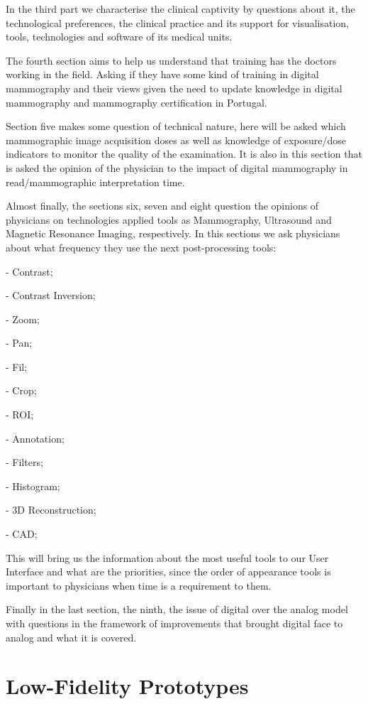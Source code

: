 In the third part we characterise the clinical captivity by questions about it, the technological preferences, the clinical practice and its support for visualisation, tools, technologies and software of its medical units.

The fourth section aims to help us understand that training has the doctors working in the field. Asking if they have some kind of training in digital mammography and their views given the need to update knowledge in digital mammography and mammography certification in Portugal.

Section five makes some question of technical nature, here will be asked which mammographic image acquisition doses as well as knowledge of exposure/dose indicators to monitor the quality of the examination. It is also in this section that is asked the opinion of the physician to the impact of digital mammography in read/mammographic interpretation time.

\clearpage

Almost finally, the sections six, seven and eight question the opinions of physicians on technologies applied tools as Mammography, Ultrasound and Magnetic Resonance Imaging, respectively. In this sections we ask physicians about what frequency they use the next post-processing tools:

- Contrast;

- Contrast Inversion;

- Zoom;

- Pan;

- Fil;

- Crop;

- ROI;

- Annotation;

- Filters;

- Histogram;

- 3D Reconstruction;

- CAD;

This will bring us the information about the most useful tools to our User Interface and what are the priorities, since the order of appearance tools is important to physicians when time is a requirement to them.

Finally in the last section, the ninth, the issue of digital over the analog model with questions in the framework of improvements that brought digital face to analog and what it is covered.

\clearpage

\section{Low-Fidelity Prototypes}

